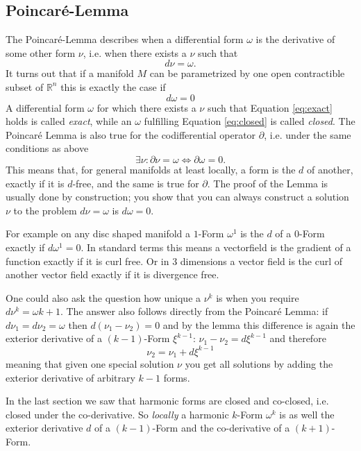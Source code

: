 \subsection{Poincar\'e-Lemma}
The Poincar\'e-Lemma describes when a differential form $\omega$ is the derivative of some other form $\nu$, i.e. when there exists a $\nu$ such that
\begin{equation} d\nu = \omega .\label{eq:exact}\end{equation}
It turns out that if a manifold $M$ can be parametrized by one open contractible subset of $\mathbb R^n$ this is exactly the case if
\begin{equation} d\omega = 0 \label{eq:closed}\end{equation}
A differential form $\omega$ for which there exists a $\nu$ such that Equation \ref{eq:exact} holds is called \emph{exact}, while an $\omega$ fulfilling Equation \ref{eq:closed} is called \emph{closed}. The Poincar\'e Lemma is also true for the codifferential operator $\partial$, i.e. under the same conditions as above
\[\exists \nu : \partial \nu = \omega \Leftrightarrow \partial \omega = 0.\]
This means that, for general manifolds at least locally, a form is the $d$ of another, exactly if it is $d$-free, and the same is true for $\partial$. The proof of the Lemma is usually done by construction; you show that you can always construct a solution $\nu$ to the problem $d\nu = \omega$ is $d\omega = 0$. 

For example on any disc shaped manifold a $1$-Form $\omega^1$ is the $d$ of a $0$-Form exactly if $d\omega^1 = 0$. In standard terms this means a vectorfield is the gradient of a function exactly if it is curl free. Or in 3 dimensions a vector field is the curl of another vector field exactly if it is divergence free.

One could also ask the question how unique a $\nu^{k}$ is when you require $d\nu^{k} = \omega{k+1}$. The answer also follows directly from the Poincar\'e Lemma: if $d\nu_1 = d\nu_2 = \omega$ then $d(\nu_1-\nu_2) = 0$ and by the lemma this difference is again the exterior derivative of a $(k-1)$-Form $\xi^{k-1}$: $\nu_1 -\nu_2 = d \xi^{k-1}$ and therefore
\[\nu_2 = \nu_1 +  d\xi^{k-1}\]
meaning that given one special solution $\nu$ you get all solutions by adding the exterior derivative of arbitrary $k-1$ forms.


In the last section we saw that harmonic forms are closed and co-closed, i.e. closed under the co-derivative.  So \emph{locally} a harmonic $k$-Form $\omega^k$ is as well the exterior derivative $d$ of a $(k-1)$-Form and the co-derivative of a $(k+1)$-Form. 

